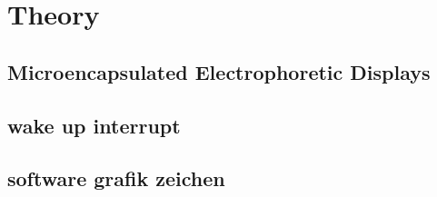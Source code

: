 \chapter{Theory}

\section{Microencapsulated Electrophoretic Displays}


\section{wake up interrupt}

\section{software grafik zeichen}